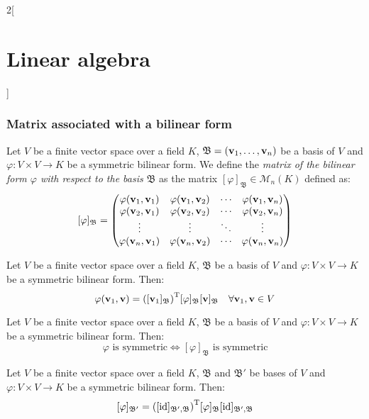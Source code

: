 \documentclass[../../../main.tex]{subfiles}
\begin{document}
\begin{multicols}{2}[\section{Linear algebra}]
  \subsubsection{Matrix associated with a bilinear form}
  \begin{definition}
    Let $V$ be a finite vector space over a field $K$, $\mathfrak{B}=(\boldsymbol{\mathrm{v}}_1,\ldots,\boldsymbol{\mathrm{v}}_n)$ be a basis of $V$ and $\varphi:V\times V\rightarrow K$ be a symmetric bilinear form. We define the \textit{matrix of the bilinear form $\varphi$ with respect to the basis $\mathfrak{B}$} as the matrix $[\varphi]_\mathfrak{B}\in\mathcal{M}_n(K)$ defined as: $$[\varphi]_\mathfrak{B}=
      \begin{pmatrix}
        \varphi(\boldsymbol{\mathrm{v}}_1,\boldsymbol{\mathrm{v}}_1) & \varphi(\boldsymbol{\mathrm{v}}_1,\boldsymbol{\mathrm{v}}_2) & \cdots & \varphi(\boldsymbol{\mathrm{v}}_1,\boldsymbol{\mathrm{v}}_n) \\
        \varphi(\boldsymbol{\mathrm{v}}_2,\boldsymbol{\mathrm{v}}_1) & \varphi(\boldsymbol{\mathrm{v}}_2,\boldsymbol{\mathrm{v}}_2) & \cdots & \varphi(\boldsymbol{\mathrm{v}}_2,\boldsymbol{\mathrm{v}}_n) \\
        \vdots                                             & \vdots                                             & \ddots & \vdots                                             \\
        \varphi(\boldsymbol{\mathrm{v}}_n,\boldsymbol{\mathrm{v}}_1) & \varphi(\boldsymbol{\mathrm{v}}_n,\boldsymbol{\mathrm{v}}_2) & \cdots & \varphi(\boldsymbol{\mathrm{v}}_n,\boldsymbol{\mathrm{v}}_n) \\
      \end{pmatrix}$$
  \end{definition}
  \begin{lemma}
    Let $V$ be a finite vector space over a field $K$, $\mathfrak{B}$ be a basis of $V$ and $\varphi:V\times V\rightarrow K$ be a symmetric bilinear form. Then:
    $$\varphi(\boldsymbol{\mathrm{v}}_1,\boldsymbol{\mathrm{v}})={\left([\boldsymbol{\mathrm{v}}_1]_\mathfrak{B}\right)}^\mathrm{T}[\varphi]_\mathfrak{B}[\boldsymbol{\mathrm{v}}]_\mathfrak{B}\quad\forall\boldsymbol{\mathrm{v}}_1,\boldsymbol{\mathrm{v}}\in V$$
  \end{lemma}
  \begin{prop}
    Let $V$ be a finite vector space over a field $K$, $\mathfrak{B}$ be a basis of $V$ and $\varphi:V\times V\rightarrow K$ be a symmetric bilinear form. Then: $$\varphi\text{ is symmetric}\iff[\varphi]_\mathfrak{B}\text{ is symmetric}$$
  \end{prop}
  \begin{prop}
    Let $V$ be a finite vector space over a field $K$, $\mathfrak{B}$ and $\mathfrak{B}'$ be bases of $V$ and $\varphi:V\times V\rightarrow K$ be a symmetric bilinear form. Then: $$[\varphi]_{\mathfrak{B}'}={([\mathrm{id}]_{\mathfrak{B}',\mathfrak{B}})}^\mathrm{T}[\varphi]_\mathfrak{B}[\mathrm{id}]_{\mathfrak{B}',\mathfrak{B}}$$
  \end{prop}

\end{multicols}
\end{document}
